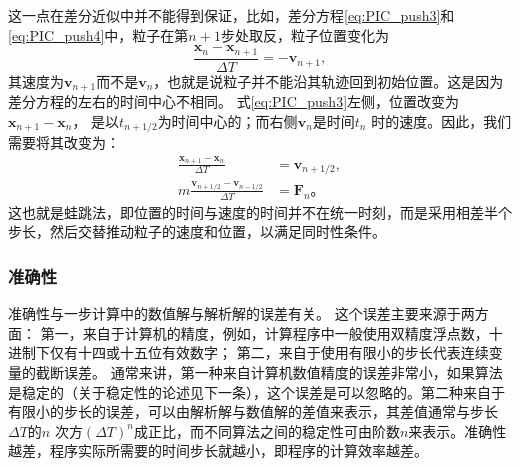 {      这一点在差分近似中并不能得到保证，比如，差分方程\eqref{eq:PIC_push3}和\eqref{eq:PIC_push4}中，粒子在第$n+1$步处取反，粒子位置变化为
      \begin{equation}
         \label{eq:PIC_push5}
         \frac{\mathbf{x}_{n}-\mathbf{x}_{n+1}}{\Delta T} = -\mathbf{v}_{n+1},
      \end{equation}
      其速度为$\mathbf{v}_{n+1}$而不是$\mathbf{v}_{n}$，也就是说粒子并不能沿其轨迹回到初始位置。这是因为差分方程的左右的时间中心不相同。
      式\eqref{eq:PIC_push3}左侧，位置改变为$\mathbf{x}_{n+1}-\mathbf{x}_n$，
      是以$t_{n+1/2}$为时间中心的；而右侧$\mathbf{v}_n$是时间$t_{n}$ 时的速度。因此，我们需要将其改变为：
      \begin{align}
         \label{eq:PIC_push6}
         \frac{\mathbf{x}_{n+1}-\mathbf{x}_n}{\Delta T} &= \mathbf{v}_{n+1/2},  \\
         \label{eq:PIC_push7}
          m\frac{\mathbf{v}_{n+1/2}-\mathbf{v}_{n-1/2}}{\Delta T} &= \mathbf{F}_n \text{。}
      \end{align}
      这也就是蛙跳法，即位置的时间与速度的时间并不在统一时刻，而是采用相差半个步长，然后交替推动粒子的速度和位置，以满足同时性条件。
\subsubsection{准确性}

      准确性与一步计算中的数值解与解析解的误差有关。
      这个误差主要来源于两方面：
      第一，来自于计算机的精度，例如，计算程序中一般使用双精度浮点数，十进制下仅有十四或十五位有效数字；
      第二，来自于使用有限小的步长代表连续变量的截断误差。
      通常来讲，第一种来自计算机数值精度的误差非常小，如果算法是稳定的（关于稳定性的论述见下一条），这个误差是可以忽略的。第二种来自于有限小的步长的误差，可以由解析解与数值解的差值来表示，其差值通常与步长$\Delta T$的$n$ 次方$(\Delta T)^n$成正比，而不同算法之间的稳定性可由阶数$n$来表示。准确性越差，程序实际所需要的时间步长就越小，即程序的计算效率越差。

}
